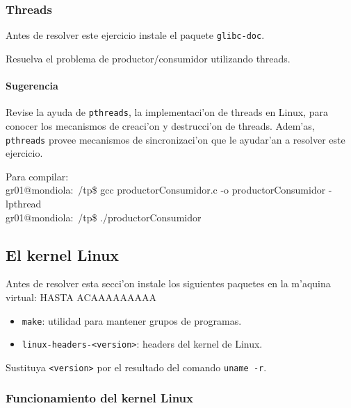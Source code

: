 
\subsubsection{Threads}

Antes de resolver este ejercicio instale el paquete \texttt{glibc-doc}.

Resuelva el problema de productor/consumidor utilizando threads.

\paragraph{Sugerencia}

Revise la ayuda de \texttt{pthreads}, la implementaci'on de threads en Linux, para conocer los mecanismos de creaci'on y
destrucci'on de threads. Adem'as, \texttt{pthreads} provee mecanismos de sincronizaci'on que le ayudar'an a resolver este
ejercicio.



\begin{envRespuesta}
Para compilar: \\
gr01@mondiola:~/tp\$ gcc productorConsumidor.c -o productorConsumidor -lpthread
\\
gr01@mondiola:~/tp\$ ./productorConsumidor
\end{envRespuesta}

\subsection{El kernel Linux}

Antes de resolver esta secci'on instale los siguientes paquetes en la m'aquina
virtual: HASTA ACAAAAAAAAA

\begin{itemize}
\item \texttt{make}: utilidad para mantener grupos de programas.
\item \texttt{linux-headers-<version>}: headers del kernel de Linux.
\end{itemize}

Sustituya \texttt{<version>} por el resultado del comando \texttt{uname -r}.

\subsubsection{Funcionamiento del kernel Linux}

